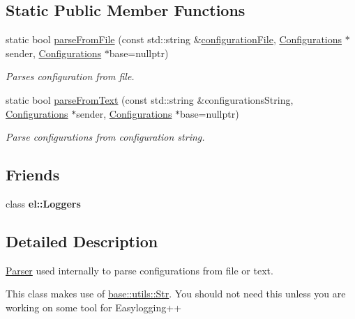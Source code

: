 \subsection*{Static Public Member Functions}
\begin{DoxyCompactItemize}
\item 
static bool \hyperlink{classel_1_1Configurations_1_1Parser_a45def5007bf368c4d2a505af58cd94c2}{parse\+From\+File} (const std\+::string \&\hyperlink{classel_1_1Configurations_a18df64bb5cd97bee672160290133141c}{configuration\+File}, \hyperlink{classel_1_1Configurations}{Configurations} $\ast$sender, \hyperlink{classel_1_1Configurations}{Configurations} $\ast$base=nullptr)
\begin{DoxyCompactList}\small\item\em Parses configuration from file. \end{DoxyCompactList}\item 
static bool \hyperlink{classel_1_1Configurations_1_1Parser_a39ec1b06f673e8155a83d66e08229129}{parse\+From\+Text} (const std\+::string \&configurations\+String, \hyperlink{classel_1_1Configurations}{Configurations} $\ast$sender, \hyperlink{classel_1_1Configurations}{Configurations} $\ast$base=nullptr)
\begin{DoxyCompactList}\small\item\em Parse configurations from configuration string. \end{DoxyCompactList}\end{DoxyCompactItemize}
\subsection*{Friends}
\begin{DoxyCompactItemize}
\item 
class {\bfseries el\+::\+Loggers}\hypertarget{classel_1_1Configurations_1_1Parser_a6efe246b312d02731fb0e1d120c0331d}{}\label{classel_1_1Configurations_1_1Parser_a6efe246b312d02731fb0e1d120c0331d}

\end{DoxyCompactItemize}


\subsection{Detailed Description}
\hyperlink{classel_1_1Configurations_1_1Parser}{Parser} used internally to parse configurations from file or text. 

This class makes use of \hyperlink{classel_1_1base_1_1utils_1_1Str}{base\+::utils\+::\+Str}. You should not need this unless you are working on some tool for Easylogging++ 

